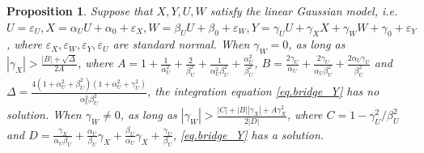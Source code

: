 \documentclass[
  12pt]{article}
\newtheorem{proposition}{Proposition}
\begin{document}
\begin{proposition}
Suppose that $X, Y, U, W$ satisfy the linear Gaussian model, \emph{i.e.} $U=\varepsilon_U,X =\alpha_U U + \alpha_0+\varepsilon_X,W =\beta_U U +\beta_0 + \varepsilon_W, Y=\gamma_U U +\gamma_X X+\gamma_W W +\gamma_0 +\varepsilon_Y$, where $\varepsilon_X, \varepsilon_W, \varepsilon_Y, \varepsilon_U$ are standard normal. When $\gamma_W = 0$, as long as $|\gamma_X|>\frac{|B|+\sqrt{\Delta}}{2A}$, where $A=1+\frac{1}{\alpha_{U}^{2}}+\frac{2}{\beta_{U}^{2}}+\frac{1}{\alpha_{U}^{2}\beta_{U}^{2}}+\frac{\alpha_{U}^{2}}{\beta_{U}^{2}}$, $B=\frac{2\gamma_U}{\alpha_U}+\frac{2\gamma_U}{\alpha_U\beta_{U}^{2}}+\frac{2\alpha_U\gamma_U}{\beta_{U}^{2}}$ and $\Delta=\frac{4\left( 1+\alpha_{U}^{2}+\beta_{U}^{2} \right) \left( 1+\alpha_{U}^{2}+\gamma_{U}^{2} \right)}{\alpha_{U}^{2}\beta_{U}^{2}}$, the integration equation \eqref{eq.bridge_Y} has no solution. When $\gamma_W \ne 0$, as long as $|\gamma_W|>\frac{|C|+|B||\gamma_X|+A\gamma_X^2}{2|D|}$, where $C=1-\gamma_U^2/\beta_U^2$ and $D=\frac{\gamma_X}{\alpha_U\beta_U}+\frac{\alpha_U}{\beta_U}\gamma_X+\frac{\beta_U}{\alpha_U}\gamma_X+\frac{\gamma_U}{\beta_U}$, \eqref{eq.bridge_Y} has a solution. 
\end{proposition}
\end{document}
